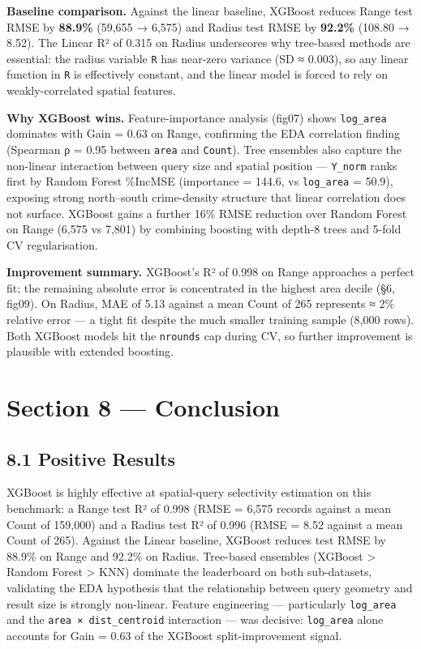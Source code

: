 \documentclass[
  10pt,
  twocolumn,
  10pt]{article}
\begin{document}
\textbf{Baseline comparison.} Against the linear baseline, XGBoost
reduces Range test RMSE by \textbf{88.9\%} (59,655 → 6,575) and Radius
test RMSE by \textbf{92.2\%} (108.80 → 8.52). The Linear R² of 0.315 on
Radius underscores why tree-based methods are essential: the radius
variable \texttt{R} has near-zero variance (SD ≈ 0.003), so any linear
function in \texttt{R} is effectively constant, and the linear model is
forced to rely on weakly-correlated spatial features.

\textbf{Why XGBoost wins.} Feature-importance analysis (fig07) shows
\texttt{log\_area} dominates with Gain = 0.63 on Range, confirming the
EDA correlation finding (Spearman ρ = 0.95 between \texttt{area} and
\texttt{Count}). Tree ensembles also capture the non-linear interaction
between query size and spatial position --- \texttt{Y\_norm} ranks first
by Random Forest \%IncMSE (importance = 144.6, vs \texttt{log\_area} =
50.9), exposing strong north--south crime-density structure that linear
correlation does not surface. XGBoost gains a further 16\% RMSE
reduction over Random Forest on Range (6,575 vs 7,801) by combining
boosting with depth-8 trees and 5-fold CV regularisation.

\textbf{Improvement summary.} XGBoost's R² of 0.998 on Range approaches
a perfect fit; the remaining absolute error is concentrated in the
highest area decile (§6, fig09). On Radius, MAE of 5.13 against a mean
Count of 265 represents ≈ 2\% relative error --- a tight fit despite the
much smaller training sample (8,000 rows). Both XGBoost models hit the
\texttt{nrounds} cap during CV, so further improvement is plausible with
extended boosting.

\section{Section 8 --- Conclusion}\label{section-8-conclusion}

\subsection{8.1 Positive Results}\label{positive-results}

XGBoost is highly effective at spatial-query selectivity estimation on
this benchmark: a Range test R² of 0.998 (RMSE = 6,575 records against a
mean Count of 159,000) and a Radius test R² of 0.996 (RMSE = 8.52
against a mean Count of 265). Against the Linear baseline, XGBoost
reduces test RMSE by 88.9\% on Range and 92.2\% on Radius. Tree-based
ensembles (XGBoost \textgreater{} Random Forest \textgreater{} KNN)
dominate the leaderboard on both sub-datasets, validating the EDA
hypothesis that the relationship between query geometry and result size
is strongly non-linear. Feature engineering --- particularly
\texttt{log\_area} and the \texttt{area\ ×\ dist\_centroid} interaction
--- was decisive: \texttt{log\_area} alone accounts for Gain = 0.63 of
the XGBoost split-improvement signal.
\end{document}
